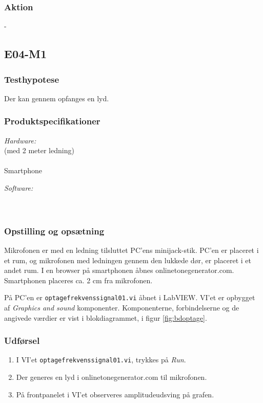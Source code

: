 		\subsubsection{Aktion}
		- 
		
		\subsection{E04-M1}
		\label{subsec:E04}
		\subsubsection{Testhypotese}
		Der kan gennem \mikrofon opfanges en lyd. 
		
		\subsubsection{Produktspecifikationer}
	
			\textit{Hardware:}\\
			\mikrofon{} (med 2 meter ledning)\\
			\PC\\
			Smartphone 
	
			\textit{Software:}\\
			\labview\\
			\onlineg\\
	
		\subsubsection{Opstilling og opsætning}
		Mikrofonen er med en ledning tilsluttet PC'ens minijack-stik. PC'en er placeret i et rum, og mikrofonen med ledningen gennem den lukkede dør, er placeret i et andet rum. I en browser på smartphonen åbnes onlinetonegenerator.com. Smartphonen placeres ca. 2 cm fra mikrofonen. 
	
			På PC'en er \texttt{optagefrekvenssignal01.vi} åbnet i LabVIEW. VI'et er opbygget af \textit{Graphics and sound} komponenter. Komponenterne, forbindelserne og de angivede værdier er vist i blokdiagrammet, i figur \ref{fig:bdoptage}.   \\    
	
		\subsubsection{Udførsel}
			\begin{enumerate}
				\item I VI'et \texttt{optagefrekvenssignal01.vi}, trykkes på \textit{Run}.  
				\item Der generes en lyd i onlinetonegenerator.com til mikrofonen. 
				\item På frontpanelet i VI'et observeres amplitudeudsving på grafen.  
			\end{enumerate}
		
